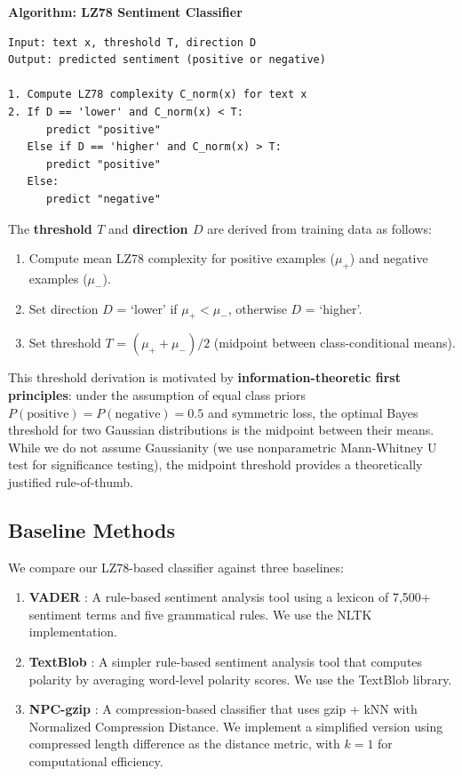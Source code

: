 \documentclass[11pt,letterpaper]{article}
\begin{document}
\textbf{Algorithm: LZ78 Sentiment Classifier}

\begin{verbatim}
Input: text x, threshold T, direction D
Output: predicted sentiment (positive or negative)

1. Compute LZ78 complexity C_norm(x) for text x
2. If D == 'lower' and C_norm(x) < T:
      predict "positive"
   Else if D == 'higher' and C_norm(x) > T:
      predict "positive"
   Else:
      predict "negative"
\end{verbatim}

The \textbf{threshold $T$} and \textbf{direction $D$} are derived from training data as follows:

\begin{enumerate}
  \item Compute mean LZ78 complexity for positive examples ($\mu_+$) and negative examples ($\mu_-$).
  \item Set direction $D$ = `lower' if $\mu_+ < \mu_-$, otherwise $D$ = `higher'.
  \item Set threshold $T$ = $(\mu_+ + \mu_-)/2$ (midpoint between class-conditional means).
\end{enumerate}

This threshold derivation is motivated by \textbf{information-theoretic first principles}: under the assumption of equal class priors $P(\text{positive}) = P(\text{negative}) = 0.5$ and symmetric loss, the optimal Bayes threshold for two Gaussian distributions is the midpoint between their means. While we do not assume Gaussianity (we use nonparametric Mann-Whitney U test for significance testing), the midpoint threshold provides a theoretically justified rule-of-thumb.

\subsection{Baseline Methods}

We compare our LZ78-based classifier against three baselines:

\begin{enumerate}
  \item \textbf{VADER} \cite{Hutto2014}: A rule-based sentiment analysis tool using a lexicon of 7,500+ sentiment terms and five grammatical rules. We use the NLTK implementation.

  \item \textbf{TextBlob} \cite{Loria2018}: A simpler rule-based sentiment analysis tool that computes polarity by averaging word-level polarity scores. We use the TextBlob library.

  \item \textbf{NPC-gzip} \cite{Jiang2023}: A compression-based classifier that uses gzip + kNN with Normalized Compression Distance. We implement a simplified version using compressed length difference as the distance metric, with $k=1$ for computational efficiency.
\end{enumerate}
\end{document}
